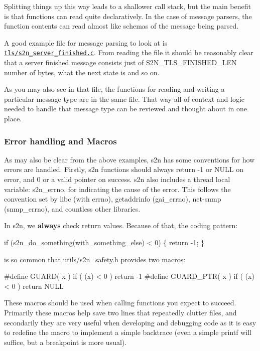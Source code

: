 Splitting things up this way leads to a shallower call stack, but the main benefit is that functions can read quite declaratively. In the case of message parsers, the function contents can read almost like schemas of the message being parsed.

A good example file for message parsing to look at is \href{https://github.com/awslabs/s2n/blob/master/tls/s2n_server_finished.c}{\tt tls/s2n\+\_\+server\+\_\+finished.\+c}. From reading the file it should be reasonably clear that a server finished message consists just of S2\+N\+\_\+\+T\+L\+S\+\_\+\+F\+I\+N\+I\+S\+H\+E\+D\+\_\+\+L\+EN number of bytes, what the next state is and so on.

As you may also see in that file, the functions for reading and writing a particular message type are in the same file. That way all of context and logic needed to handle that message type can be reviewed and thought about in one place.

\subsubsection*{Error handling and Macros}

As may also be clear from the above examples, s2n has some conventions for how errors are handled. Firstly, s2n functions should always return -\/1 or N\+U\+LL on error, and 0 or a valid pointer on success. s2n also includes a thread local variable\+: s2n\+\_\+errno, for indicating the cause of the error. This follows the convention set by libc (with errno), getaddrinfo (gai\+\_\+errno), net-\/snmp (snmp\+\_\+errno), and countless other libraries.

In s2n, we {\bfseries always} check return values. Because of that, the coding pattern\+:


\begin{DoxyCode}
\textcolor{keywordflow}{if} (s2n\_do\_something(with\_something\_else) < 0) \{
    \textcolor{keywordflow}{return} -1;
\}
\end{DoxyCode}


is so common that \hyperlink{s2n__safety_8h}{utils/s2n\+\_\+safety.\+h} provides two macros\+:


\begin{DoxyCode}
\textcolor{preprocessor}{#define GUARD( x )      if ( (x) < 0 ) return -1}
\textcolor{preprocessor}{#define GUARD\_PTR( x )  if ( (x) < 0 ) return NULL}
\end{DoxyCode}


These macros should be used when calling functions you expect to succeed. Primarily these macros help save two lines that repeatedly clutter files, and secondarily they are very useful when developing and debugging code as it is easy to redefine the macro to implement a simple backtrace (even a simple printf will suffice, but a breakpoint is more usual).

